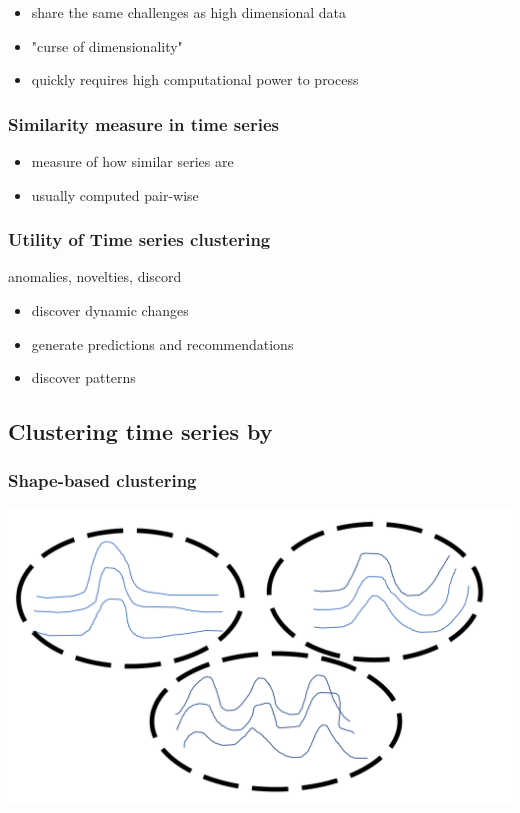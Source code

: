 \documentclass[11pt]{article}
\begin{document}
\begin{itemize}
\item share the same challenges as high dimensional data
\item "curse of dimensionality"
\item quickly requires high computational power to process
\end{itemize}

\subsubsection*{Similarity measure in time series}
\label{sec:org97cdfd9}
\begin{itemize}
\item measure of how similar series are
\item usually computed pair-wise
\end{itemize}

\subsubsection*{Utility of Time series clustering}
\label{sec:org4e5416c}
anomalies, novelties, discord

\begin{itemize}
\item discover dynamic changes
\item generate predictions and recommendations
\item discover patterns
\end{itemize}

\subsection*{Clustering time series by}
\label{sec:org63e850f}
\subsubsection*{Shape-based clustering}
\label{sec:orgd8a8f04}
\begin{center}
\includegraphics[width=.9\linewidth]{./img/shape_based_clustering.png}
\end{center}
\end{document}

